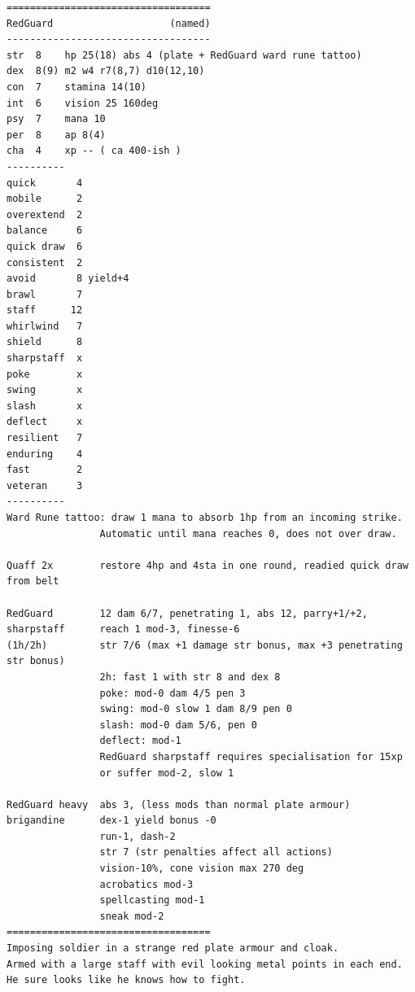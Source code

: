 \goodbreak \begin{samepage} \vsmall \begin{verbatim}
===================================
RedGuard                    (named)
-----------------------------------
str  8    hp 25(18) abs 4 (plate + RedGuard ward rune tattoo)
dex  8(9) m2 w4 r7(8,7) d10(12,10)
con  7    stamina 14(10)
int  6    vision 25 160deg
psy  7    mana 10
per  8    ap 8(4)
cha  4    xp -- ( ca 400-ish )
----------
quick       4
mobile      2
overextend  2
balance     6
quick draw  6
consistent  2
avoid       8 yield+4
brawl       7
staff      12
whirlwind   7
shield      8
sharpstaff  x
poke        x
swing       x
slash       x
deflect     x
resilient   7
enduring    4
fast        2
veteran     3
----------
Ward Rune tattoo: draw 1 mana to absorb 1hp from an incoming strike.
                Automatic until mana reaches 0, does not over draw.

Quaff 2x        restore 4hp and 4sta in one round, readied quick draw from belt

RedGuard        12 dam 6/7, penetrating 1, abs 12, parry+1/+2,
sharpstaff      reach 1 mod-3, finesse-6
(1h/2h)         str 7/6 (max +1 damage str bonus, max +3 penetrating str bonus)
                2h: fast 1 with str 8 and dex 8
                poke: mod-0 dam 4/5 pen 3
                swing: mod-0 slow 1 dam 8/9 pen 0
                slash: mod-0 dam 5/6, pen 0
                deflect: mod-1
                RedGuard sharpstaff requires specialisation for 15xp 
                or suffer mod-2, slow 1

RedGuard heavy  abs 3, (less mods than normal plate armour)
brigandine      dex-1 yield bonus -0
                run-1, dash-2
                str 7 (str penalties affect all actions)
                vision-10%, cone vision max 270 deg
                acrobatics mod-3
                spellcasting mod-1
                sneak mod-2
===================================
Imposing soldier in a strange red plate armour and cloak.
Armed with a large staff with evil looking metal points in each end.
He sure looks like he knows how to fight.
\end{verbatim} \normalsize \end{samepage}

\

